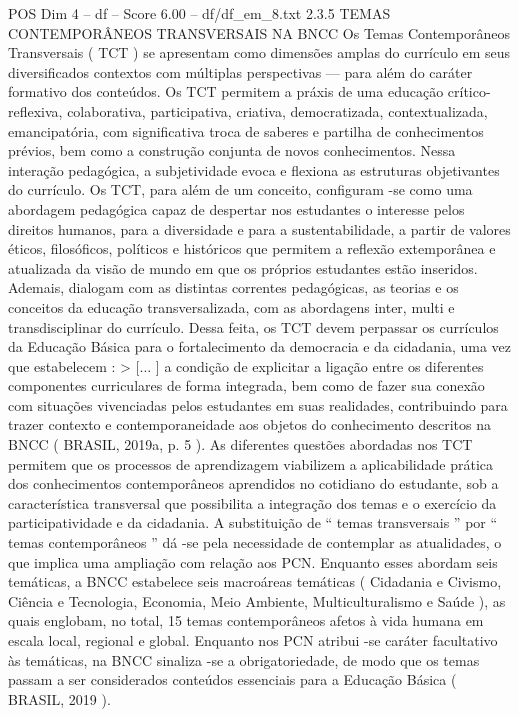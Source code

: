 \begin{textsample}{POS Dim 4 – df – Score 6.00 – df/df\_em\_8.txt}  \label{ex:f4_pos_229}
2.3.5 TEMAS CONTEMPORÂNEOS TRANSVERSAIS NA BNCC Os Temas Contemporâneos Transversais ( TCT ) se apresentam como dimensões amplas do currículo em seus diversificados contextos com múltiplas perspectivas — para além do caráter formativo dos conteúdos.
Os TCT permitem a práxis de uma educação crítico-reflexiva, colaborativa, participativa, criativa, democratizada, contextualizada, emancipatória, com significativa troca de saberes e partilha de conhecimentos prévios, bem como a construção conjunta de novos conhecimentos.
Nessa interação pedagógica, a subjetividade evoca e flexiona as estruturas objetivantes do currículo.
Os TCT, para além de um conceito, configuram -se como uma abordagem pedagógica capaz de despertar nos estudantes o interesse pelos direitos humanos, para a diversidade e para a sustentabilidade, a partir de valores éticos, filosóficos, políticos e históricos que permitem a reflexão extemporânea e atualizada da visão de mundo em que os próprios estudantes estão inseridos.
Ademais, dialogam com as distintas correntes pedagógicas, as teorias e os conceitos da educação transversalizada, com as abordagens inter, multi e transdisciplinar do currículo.
Dessa feita, os TCT devem perpassar os currículos da Educação Básica para o fortalecimento da democracia e da cidadania, uma vez que estabelecem : > [... ] a condição de explicitar a ligação entre os diferentes componentes curriculares de forma integrada, bem como de fazer sua conexão com situações vivenciadas pelos estudantes em suas realidades, contribuindo para trazer contexto e contemporaneidade aos objetos do conhecimento descritos na BNCC ( BRASIL, 2019a, p. 5 ).
As diferentes questões abordadas nos TCT permitem que os processos de aprendizagem viabilizem a aplicabilidade prática dos conhecimentos contemporâneos aprendidos no cotidiano do estudante, sob a característica transversal que possibilita a integração dos temas e o exercício da participatividade e da cidadania.
A substituição de “ temas transversais ” por “ temas contemporâneos ” dá -se pela necessidade de contemplar as atualidades, o que implica uma ampliação com relação aos PCN.
Enquanto esses abordam seis temáticas, a BNCC estabelece seis macroáreas temáticas ( Cidadania e Civismo, Ciência e Tecnologia, Economia, Meio Ambiente, Multiculturalismo e Saúde ), as quais englobam, no total, 15 temas contemporâneos afetos à vida humana em escala local, regional e global.
Enquanto nos PCN atribui -se caráter facultativo às temáticas, na BNCC sinaliza -se a obrigatoriedade, de modo que os temas passam a ser considerados conteúdos essenciais para a Educação Básica ( BRASIL, 2019 ).

\end{textsample}

